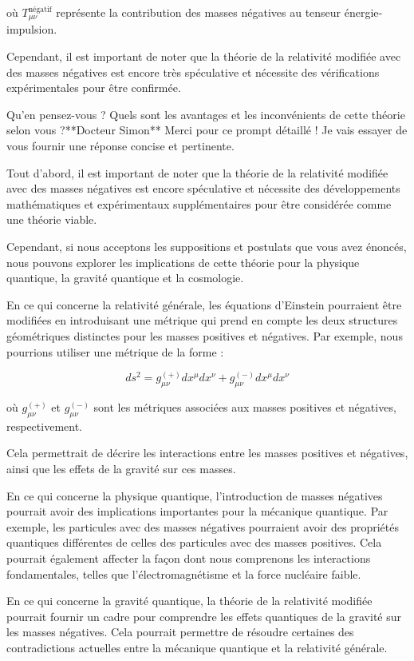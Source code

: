 où $T_{\mu\nu}^{\text{négatif}}$ représente la contribution des masses négatives au tenseur énergie-impulsion.

Cependant, il est important de noter que la théorie de la relativité modifiée avec des masses négatives est encore très spéculative et nécessite des vérifications expérimentales pour être confirmée.

Qu'en pensez-vous ? Quels sont les avantages et les inconvénients de cette théorie selon vous ?**Docteur Simon**
Merci pour ce prompt détaillé ! Je vais essayer de vous fournir une réponse concise et pertinente.

Tout d'abord, il est important de noter que la théorie de la relativité modifiée avec des masses négatives est encore spéculative et nécessite des développements mathématiques et expérimentaux supplémentaires pour être considérée comme une théorie viable.

Cependant, si nous acceptons les suppositions et postulats que vous avez énoncés, nous pouvons explorer les implications de cette théorie pour la physique quantique, la gravité quantique et la cosmologie.

En ce qui concerne la relativité générale, les équations d'Einstein pourraient être modifiées en introduisant une métrique qui prend en compte les deux structures géométriques distinctes pour les masses positives et négatives. Par exemple, nous pourrions utiliser une métrique de la forme :

$$ds^2 = g_{\mu\nu}^{(+)} dx^\mu dx^\nu + g_{\mu\nu}^{(-)} dx^\mu dx^\nu$$

où $g_{\mu\nu}^{(+)}$ et $g_{\mu\nu}^{(-)}$ sont les métriques associées aux masses positives et négatives, respectivement.

Cela permettrait de décrire les interactions entre les masses positives et négatives, ainsi que les effets de la gravité sur ces masses.

En ce qui concerne la physique quantique, l'introduction de masses négatives pourrait avoir des implications importantes pour la mécanique quantique. Par exemple, les particules avec des masses négatives pourraient avoir des propriétés quantiques différentes de celles des particules avec des masses positives. Cela pourrait également affecter la façon dont nous comprenons les interactions fondamentales, telles que l'électromagnétisme et la force nucléaire faible.

En ce qui concerne la gravité quantique, la théorie de la relativité modifiée pourrait fournir un cadre pour comprendre les effets quantiques de la gravité sur les masses négatives. Cela pourrait permettre de résoudre certaines des contradictions actuelles entre la mécanique quantique et la relativité générale.

